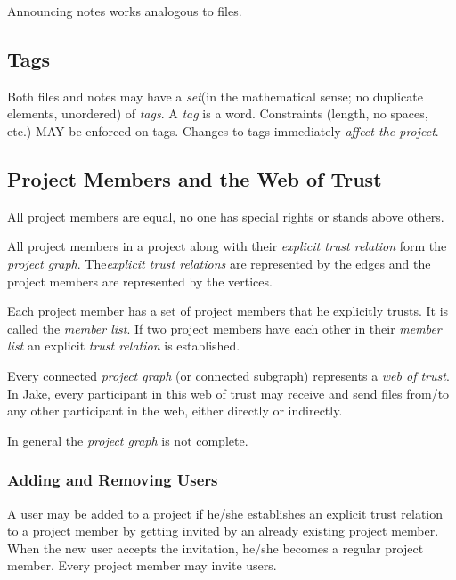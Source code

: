 Announcing notes works analogous to files.

\subsection{Tags}
Both files and notes may have a \emph{set}(in the mathematical sense; no duplicate elements, unordered) of \emph{tags}. A \emph{tag} is a 
word. Constraints (length, no spaces, etc.) MAY be enforced on tags. Changes to tags immediately \emph{affect the project}.

\subsection{Project Members and the Web of Trust}
All project members are equal, no one has special rights or stands above others.

All project members in a project along with their \emph{explicit trust relation} form the \emph{project graph}. The\emph{explicit trust relations} are represented by the edges and the project members are represented by the 
vertices.

Each project member has a set of project members that he explicitly trusts. It is called the \emph{member list}. If two project members have each other in their \emph{member list} an explicit \emph{trust relation} is established. 

Every connected \emph{project graph} (or connected subgraph) represents a \emph{web of trust}. In Jake, every participant in this web of trust may receive and send files from/to any other participant in the web, either directly or indirectly. 

In general the \emph{project graph} is not complete.

\subsubsection{Adding and Removing Users}
A user may be added to a project if he/she establishes an explicit trust relation to a project member by getting invited by an already existing project member. When the new user accepts the invitation, he/she becomes a regular project member. Every project member may invite users. 

